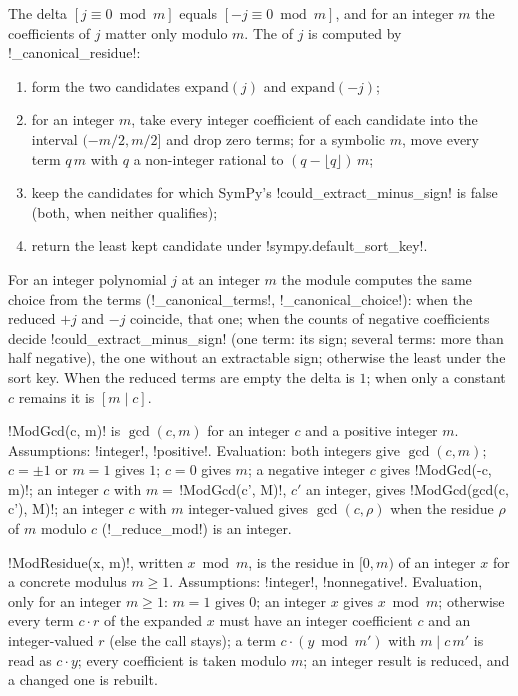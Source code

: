 \begin{definition}\label{def:algebra-delta-canon}
The delta $[j\equiv 0\bmod m]$ equals $[-j\equiv 0\bmod m]$, and for an integer $m$ the coefficients of $j$ matter only modulo $m$. The  of $j$ is computed by \py!_canonical_residue!:
\begin{enumerate}
\item form the two candidates $\mathrm{expand}(j)$ and $\mathrm{expand}(-j)$;
\item for an integer $m$, take every integer coefficient of each candidate into the interval $(-m/2,m/2]$ and drop zero terms; for a symbolic $m$, move every term $q\,m$ with $q$ a non-integer rational to $(q-\lfloor q\rfloor)\,m$;
\item keep the candidates for which SymPy's \py!could_extract_minus_sign! is false (both, when neither qualifies);
\item return the least kept candidate under \py!sympy.default_sort_key!.
\end{enumerate}
For an integer polynomial $j$ at an integer $m$ the module computes the same choice from the terms (\py!_canonical_terms!, \py!_canonical_choice!): when the reduced $+j$ and $-j$ coincide, that one; when the counts of negative coefficients decide \py!could_extract_minus_sign! (one term: its sign; several terms: more than half negative), the one without an extractable sign; otherwise the least under the sort key. When the reduced terms are empty the delta is $1$; when only a constant $c$ remains it is $[m\mid c]$.
\end{definition}

\begin{definition}\label{def:algebra-modgcd}
\py!ModGcd(c, m)! is $\gcd(c,m)$ for an integer $c$ and a positive integer $m$. Assumptions: \code!integer!, \code!positive!. Evaluation: both integers give $\gcd(c,m)$; $c=\pm 1$ or $m=1$ gives $1$; $c=0$ gives $m$; a negative integer $c$ gives \py!ModGcd(-c, m)!; an integer $c$ with $m=$\,\py!ModGcd(c', M)!, $c'$ an integer, gives \py!ModGcd(gcd(c, c'), M)!; an integer $c$ with $m$ integer-valued gives $\gcd(c,\rho)$ when the residue $\rho$ of $m$ modulo $c$ (\py!_reduce_mod!) is an integer.
\end{definition}

\begin{definition}[Residue]\label{def:algebra-modresidue}
\py!ModResidue(x, m)!, written $x\bmod m$, is the residue in $[0,m)$ of an integer $x$ for a concrete modulus $m\ge 1$. Assumptions: \code!integer!, \code!nonnegative!. Evaluation, only for an integer $m\ge 1$: $m=1$ gives $0$; an integer $x$ gives $x\bmod m$; otherwise every term $c\cdot r$ of the expanded $x$ must have an integer coefficient $c$ and an integer-valued $r$ (else the call stays); a term $c\cdot(y\bmod m')$ with $m\mid c\,m'$ is read as $c\cdot y$; every coefficient is taken modulo $m$; an integer result is reduced, and a changed one is rebuilt.
\end{definition}

